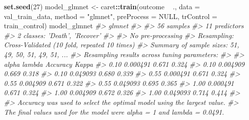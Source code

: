 \documentclass[]{book}
\newenvironment{Shaded}{\begin{snugshade}}{\end{snugshade}}
\newcommand{\CommentTok}[1]{\textcolor[rgb]{0.56,0.35,0.01}{\textit{#1}}}
\newcommand{\DataTypeTok}[1]{\textcolor[rgb]{0.13,0.29,0.53}{#1}}
\newcommand{\DecValTok}[1]{\textcolor[rgb]{0.00,0.00,0.81}{#1}}
\newcommand{\KeywordTok}[1]{\textcolor[rgb]{0.13,0.29,0.53}{\textbf{#1}}}
\newcommand{\NormalTok}[1]{#1}
\newcommand{\OperatorTok}[1]{\textcolor[rgb]{0.81,0.36,0.00}{\textbf{#1}}}
\newcommand{\OtherTok}[1]{\textcolor[rgb]{0.56,0.35,0.01}{#1}}
\newcommand{\StringTok}[1]{\textcolor[rgb]{0.31,0.60,0.02}{#1}}
\begin{document}
\begin{Shaded}
\begin{Highlighting}[]
\KeywordTok{set.seed}\NormalTok{(}\DecValTok{27}\NormalTok{)}
\NormalTok{model_glmnet <-}\StringTok{ }\NormalTok{caret}\OperatorTok{::}\KeywordTok{train}\NormalTok{(outcome }\OperatorTok{~}\StringTok{ }\NormalTok{.,}
                             \DataTypeTok{data =}\NormalTok{ val_train_data,}
                             \DataTypeTok{method =} \StringTok{"glmnet"}\NormalTok{,}
                             \DataTypeTok{preProcess =} \OtherTok{NULL}\NormalTok{,}
                             \DataTypeTok{trControl =}\NormalTok{ train_control)}
\NormalTok{model_glmnet}
\CommentTok{#> glmnet }
\CommentTok{#> }
\CommentTok{#> 56 samples}
\CommentTok{#> 11 predictors}
\CommentTok{#>  2 classes: 'Death', 'Recover' }
\CommentTok{#> }
\CommentTok{#> No pre-processing}
\CommentTok{#> Resampling: Cross-Validated (10 fold, repeated 10 times) }
\CommentTok{#> Summary of sample sizes: 51, 49, 50, 51, 49, 51, ... }
\CommentTok{#> Resampling results across tuning parameters:}
\CommentTok{#> }
\CommentTok{#>   alpha  lambda    Accuracy  Kappa}
\CommentTok{#>   0.10   0.000491  0.671     0.324}
\CommentTok{#>   0.10   0.004909  0.669     0.318}
\CommentTok{#>   0.10   0.049093  0.680     0.339}
\CommentTok{#>   0.55   0.000491  0.671     0.324}
\CommentTok{#>   0.55   0.004909  0.671     0.322}
\CommentTok{#>   0.55   0.049093  0.695     0.365}
\CommentTok{#>   1.00   0.000491  0.671     0.324}
\CommentTok{#>   1.00   0.004909  0.672     0.326}
\CommentTok{#>   1.00   0.049093  0.714     0.414}
\CommentTok{#> }
\CommentTok{#> Accuracy was used to select the optimal model using the largest value.}
\CommentTok{#> The final values used for the model were alpha = 1 and lambda = 0.0491.}
\end{Highlighting}
\end{Shaded}
\end{document}
